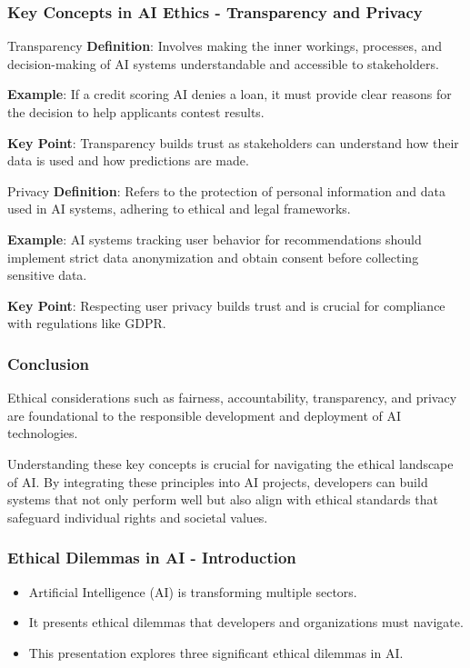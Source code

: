 \documentclass[aspectratio=169]{beamer}
\begin{document}
\begin{frame}[fragile]
    \frametitle{Key Concepts in AI Ethics - Transparency and Privacy}
    \begin{block}{Transparency}
        \textbf{Definition}: Involves making the inner workings, processes, and decision-making of AI systems understandable and accessible to stakeholders.
        
        \textbf{Example}: If a credit scoring AI denies a loan, it must provide clear reasons for the decision to help applicants contest results.
        
        \textbf{Key Point}: Transparency builds trust as stakeholders can understand how their data is used and how predictions are made.
    \end{block}
    
    \begin{block}{Privacy}
        \textbf{Definition}: Refers to the protection of personal information and data used in AI systems, adhering to ethical and legal frameworks.
        
        \textbf{Example}: AI systems tracking user behavior for recommendations should implement strict data anonymization and obtain consent before collecting sensitive data.
        
        \textbf{Key Point}: Respecting user privacy builds trust and is crucial for compliance with regulations like GDPR.
    \end{block}
\end{frame}

\begin{frame}[fragile]
    \frametitle{Conclusion}
    Ethical considerations such as fairness, accountability, transparency, and privacy are foundational to the responsible development and deployment of AI technologies.
    
    Understanding these key concepts is crucial for navigating the ethical landscape of AI. By integrating these principles into AI projects, developers can build systems that not only perform well but also align with ethical standards that safeguard individual rights and societal values.
\end{frame}

\begin{frame}[fragile]
    \frametitle{Ethical Dilemmas in AI - Introduction}
    \begin{itemize}
        \item Artificial Intelligence (AI) is transforming multiple sectors.
        \item It presents ethical dilemmas that developers and organizations must navigate.
        \item This presentation explores three significant ethical dilemmas in AI.
    \end{itemize}
\end{frame}
\end{document}

